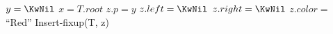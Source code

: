 \documentclass{subfiles}
\begin{document}
    \begin{procedure}
        \caption{RB-Insert(T, z)}\label{proc:RB-insert}
        $ y = \KwNil $ \;\DontPrintSemicolon
        $ x = T.root $ \;\DontPrintSemicolon
        $ z.p = y $ \;\DontPrintSemicolon
        $ z.left = \KwNil $ \;\DontPrintSemicolon
        $ z.right = \KwNil $ \;\DontPrintSemicolon
        $ z.color = $ ``Red'' \;\DontPrintSemicolon
        Insert-fixup(T, z)
    \end{procedure}
\end{document}
